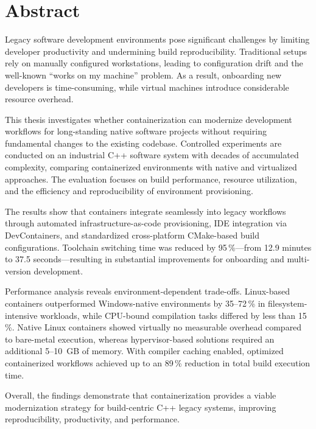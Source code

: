 \chapter{Abstract}

Legacy software development environments pose significant challenges by limiting developer productivity and undermining build reproducibility.
Traditional setups rely on manually configured workstations, leading to configuration drift and the well-known ``works on my machine'' problem.
As a result, onboarding new developers is time-consuming, while virtual machines introduce considerable resource overhead.

This thesis investigates whether containerization can modernize development workflows for long-standing native software projects without requiring fundamental changes to the existing codebase.
Controlled experiments are conducted on an industrial C++ software system with decades of accumulated complexity, comparing containerized environments with native and virtualized approaches.
The evaluation focuses on build performance, resource utilization, and the efficiency and reproducibility of environment provisioning.

\begin{sloppypar}
The results show that containers integrate seamlessly into legacy workflows through automated infrastructure-as-code provisioning, IDE integration via DevContainers, and standardized cross-platform CMake-based build configurations.
Toolchain switching time was reduced by 95\,\%---from 12.9 minutes to 37.5 seconds---resulting in substantial improvements for onboarding and multi-version development.
\end{sloppypar}

Performance analysis reveals environment-dependent trade-offs.
Linux-based containers outperformed Windows-native environments by 35--72\,\% in filesystem-intensive workloads, while CPU-bound compilation tasks differed by less than 15\,\%.
Native Linux containers showed virtually no measurable overhead compared to bare-metal execution, whereas hypervisor-based solutions required an additional 5--10~GB of memory.
With compiler caching enabled, optimized containerized workflows achieved up to an 89\,\% reduction in total build execution time.

Overall, the findings demonstrate that containerization provides a viable modernization strategy for build-centric C++ legacy systems, improving reproducibility, productivity, and performance.
